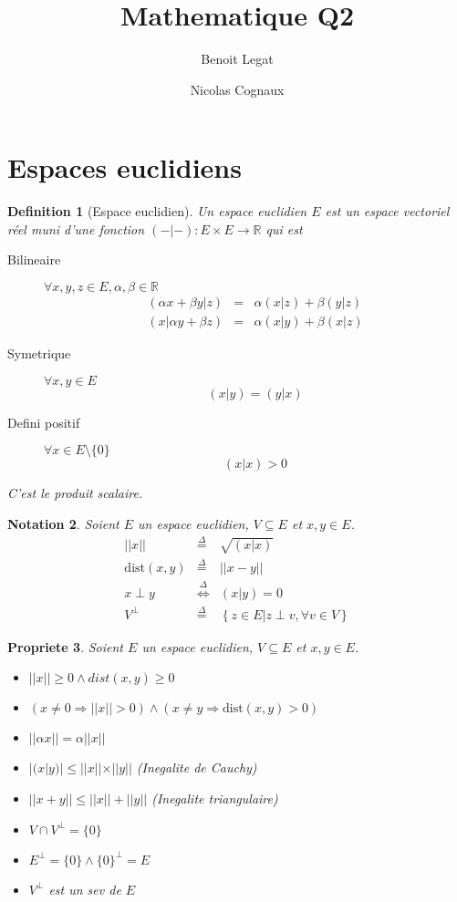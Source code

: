\documentclass[11pt,a4paper]{article} %
\title{Mathematique Q2}
\author{Benoit Legat \and Nicolas Cognaux}
\newtheorem{defin}{Definition}[section]
\newtheorem{nota}[defin]{Notation}
\newtheorem{prop}[defin]{Propriete}
\begin{document}
\maketitle

\newcommand\dist{\mathrm{dist}}
\newcommand\Ker{\mathrm{Ker}}
\renewcommand\Im{\mathrm{Im}}

\section{Espaces euclidiens}
\begin{defin}[Espace euclidien]
	Un espace euclidien $E$ est un espace vectoriel réel muni d'une fonction
	$(-|-) : E \times E \to \mathbb{R}$ qui est
	\begin{description}
		\item[Bilineaire]
			$\forall x, y, z \in E, \alpha, \beta \in \mathbb{R}$
			\begin{eqnarray*}
				(\alpha x + \beta y | z) & = & \alpha (x | z) + \beta (y | z)\\
				(x | \alpha y + \beta z) & = & \alpha (x | y) + \beta (x | z)
			\end{eqnarray*}
		\item[Symetrique]
			$\forall x,y \in E$
			$$(x|y) = (y|x)$$
		\item[Defini positif]
			$\forall x \in E \setminus \{0\}$
			$$(x|x) > 0$$
	\end{description}
	C'est le produit scalaire.
\end{defin}

\begin{nota}
	Soient $E$ un espace euclidien, $V \subseteq E$ et $x,y \in E$.
	\begin{eqnarray*}
		||x|| & \stackrel{\Delta}{=} & \sqrt{(x|x)}\\
		\dist(x, y) & \stackrel{\Delta}{=} & ||x - y||\\
		x \perp y & \stackrel{\Delta}{\Leftrightarrow} & (x|y) = 0\\
		V^{\perp} & \stackrel{\Delta}{=} & \left\{z \in E | z \perp v, \forall v \in V\right\}
	\end{eqnarray*}
\end{nota}

\begin{prop}
	Soient $E$ un espace euclidien, $V \subseteq E$ et $x,y \in E$.
	\begin{itemize}
		\item $||x|| \geq 0 \land dist(x, y) \geq 0$
		\item $(x \neq 0 \Rightarrow ||x|| > 0) \land (x \neq y \Rightarrow \dist(x, y) > 0)$
		\item $||\alpha x|| = \alpha||x||$
		\item $|(x | y)| \leq ||x||\times||y||$ (Inegalite de Cauchy)
		\item $||x + y|| \leq ||x|| + ||y||$ (Inegalite triangulaire)
		\item $V \cap V^{\perp} = \{0\}$
		\item $E^{\perp} = \{0\} \land \{0\}^{\perp} = E$
		\item $V^{\perp}$ est un sev de $E$
	\end{itemize}
\end{prop}
\end{document}
